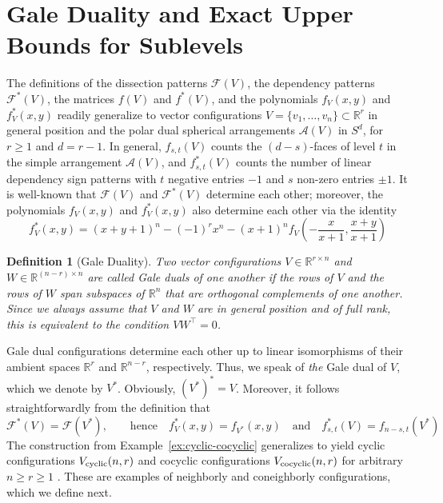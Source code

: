\documentclass[11pt]{article}
\newtheorem{definition}[theorem]{Definition}
\newcommand{\arr}{\mathcal{A}}
\renewcommand{\geq}{\geqslant}
\newcommand{\R}{\mathbb{R}}
\newcommand{\cyclic}{V_{\textup{cyclic}}}
\newcommand{\cocyclic}{V_{\textup{cocyclic}}}
\begin{document}
\section{Gale Duality and Exact Upper Bounds for Sublevels}
\label{sec:Gale}
%
The definitions of the dissection patterns $\mathcal{F}(V)$, the dependency patterns $\mathcal{F}^*(V)$, the matrices $f(V)$ and $f^*(V)$, and the polynomials $f_V(x,y)$ and $f^*_V(x,y)$ readily generalize to vector configurations $V=\{v_1,\dots,v_n\} \subset \R^r$ in general position and the polar dual spherical arrangements $\arr(V)$ in $S^d$, for $r\geq 1$ and $d=r-1$. In general, 
$f_{s,t}(V)$ counts the $(d-s)$-faces of level $t$ in the simple arrangement $\arr(V)$, and $f^*_{s,t}(V)$ counts the number of linear dependency sign patterns with $t$ negative entries $-1$ and $s$ non-zero entries $\pm 1$.
%
It is well-known that $\mathcal{F}(V)$ and $\mathcal{F}^*(V)$ determine each other; moreover, the polynomials $f_V(x,y)$ and $f^*_V(x,y)$ also determine each other \cite[Theorem~23]{SW:DS} via the identity
\begin{equation}
\label{eq:fstar-f}
f^*_V(x,y)=(x+y+1)^n - (-1)^r x^n -(x+1)^n f_V(\textstyle -\frac{x}{x+1},\frac{x+y}{x+1})
\end{equation}
%
%
 \begin{definition}[Gale Duality] 
\label{def:Gale}
Two vector configurations $V \in \R^{r\times n}$ and $W\in \R^{(n-r)\times n}$ are called \emph{Gale duals} of one another if the rows of $V$ and the rows of $W$ span subspaces of $\R^n$ that are orthogonal complements of one another. Since we always assume that $V$ and $W$ are in general position and of full rank, this is equivalent to the condition $VW^{\top} = 0$.
\end{definition}
%
Gale dual configurations determine each other up to linear isomorphisms of their ambient spaces $\R^r$ and $\R^{n-r}$, respectively. Thus, we %
speak of \emph{the} Gale dual of $V$, which we denote by $V^*$. Obviously, $(V^*)^*=V$.
Moreover, it follows straightforwardly from the definition that
\[\mathcal{F}^{*}(V)=\mathcal{F}(V^*),\qquad \textrm{hence} \quad f^*_V(x,y)=f_{V^*}(x,y) \quad \textrm{and}\quad f^*_{s,t}(V)=f_{n-s,t}(V^*)\]
%
The construction from Example~\ref{ex:cyclic-cocyclic} generalizes to yield cyclic configurations $\cyclic(n,r)$ and cocyclic configurations $\cocyclic(n,r)$ for arbitrary $n\geq r\geq 1$ \cite{Ziegler:1995aa,Matousek:2003aa}. These are examples of neighborly and coneighborly configurations, which we define next.
\end{document}
